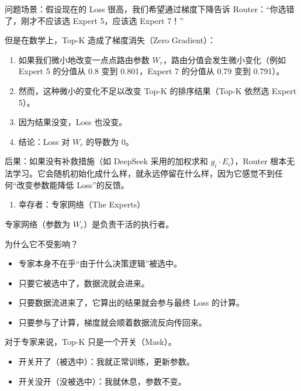 问题场景：假设现在的 Loss 很高，我们希望通过梯度下降告诉 Router：``你选错了，刚才不应该选 Expert 5，应该选 Expert 7！''

但是在数学上，Top-K 造成了梯度消失（Zero Gradient）：

\begin{enumerate}
\def\labelenumi{\arabic{enumi}.}
\tightlist
\item
  如果我们微小地改变一点点路由参数 \(W_r\)，路由分值会发生微小变化（例如 Expert 5 的分值从 0.8 变到 0.801，Expert 7 的分值从 0.79 变到 0.791）。
\item
  然而，这种微小的变化不足以改变 Top-K 的排序结果（Top-K 依然选 Expert 5）。
\item
  因为结果没变，Loss 也没变。
\item
  结论：Loss 对 \(W_r\) 的导数为 0。
\end{enumerate}

后果：如果没有补救措施（如 DeepSeek 采用的加权求和 \(g_i \cdot E_i\)），Router 根本无法学习。它会随机初始化成什么样，就永远停留在什么样，因为它感觉不到任何``改变参数能降低 Loss''的反馈。

\begin{enumerate}
\def\labelenumi{\arabic{enumi}.}
\setcounter{enumi}{1}
\tightlist
\item
  幸存者：专家网络（The Experts）
\end{enumerate}

专家网络（参数为 \(W_e\)）是负责干活的执行者。

为什么它不受影响？

\begin{itemize}
\tightlist
\item
  专家本身不在乎``由于什么决策逻辑''被选中。
\item
  只要它被选中了，数据流就会进来。
\item
  只要数据流进来了，它算出的结果就会参与最终 Loss 的计算。
\item
  只要参与了计算，梯度就会顺着数据流反向传回来。
\end{itemize}

对于专家来说，Top-K 只是一个开关（Mask）。

\begin{itemize}
\tightlist
\item
  开关开了（被选中）：我就正常训练，更新参数。
\item
  开关没开（没被选中）：我就休息，参数不变。
\end{itemize}

